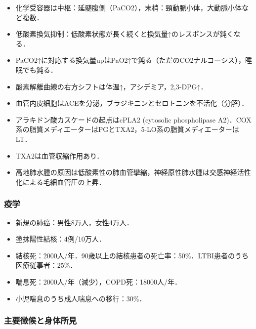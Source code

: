 \begin{itemize}
\item 化学受容器は中枢：延髄腹側（PaCO2），末梢：頸動脈小体，大動脈小体など複数．
\item 低酸素換気抑制：低酸素状態が長く続くと換気量↑のレスポンスが鈍くなる．
\item PaCO2↑に対応する換気量upはPaO2↑で鈍る（ただのCO2ナルコーシス），睡眠でも鈍る．
\item 酸素解離曲線の右方シフトは体温↑，アシデミア，2,3-DPG↑．
\item 血管内皮細胞はACEを分泌，ブラジキニンとセロトニンを不活化（分解）．
\item アラキドン酸カスケードの起点はcPLA2 (cytosolic phospholipase A2)．COX系の脂質メディエーターはPGとTXA2，5-LO系の脂質メディエーターはLT．
\item TXA2は血管収縮作用あり．
\item 高地肺水腫の原因は低酸素性の肺血管攣縮，神経原性肺水腫は交感神経活性化による毛細血管圧の上昇．
\end{itemize}


\subsubsection{疫学}

\begin{itemize}
\item 新規の肺癌：男性8万人，女性4万人．
\item 塗抹陽性結核：4例/10万人．
\item 結核死：2000人/年．90歳以上の結核患者の死亡率：50\%．LTBI患者のうち医療従事者：25\%．
\item 喘息死：2000人/年（減少），COPD死：18000人/年．
\item 小児喘息のうち成人喘息への移行：30\%．
\end{itemize}


\subsubsection{主要徴候と身体所見}

